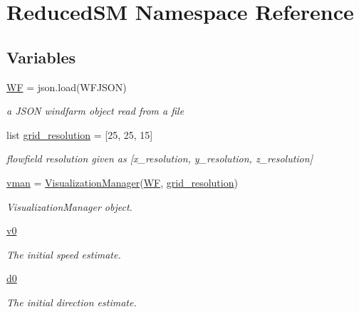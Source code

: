 \hypertarget{namespace_reduced_s_m}{}\section{Reduced\+SM Namespace Reference}
\label{namespace_reduced_s_m}
\subsection*{Variables}
\begin{DoxyCompactItemize}
\item 
\mbox{\hyperlink{namespace_reduced_s_m_ad2cb878a0bc5ba18176fff5ab9b02dc3}{WF}} = json.\+load(W\+F\+J\+S\+ON)
\begin{DoxyCompactList}\small\item\em a J\+S\+ON windfarm object read from a file \end{DoxyCompactList}\item 
list \mbox{\hyperlink{namespace_reduced_s_m_ac73e3bc6b17648d508dd822d76929524}{grid\+\_\+resolution}} = \mbox{[}25, 25, 15\mbox{]}
\begin{DoxyCompactList}\small\item\em flowfield resolution given as \mbox{[}x\+\_\+resolution, y\+\_\+resolution, z\+\_\+resolution\mbox{]} \end{DoxyCompactList}\item 
\mbox{\hyperlink{namespace_reduced_s_m_aea7c8ee42c44fbc9f8c3702567edc840}{vman}} = \mbox{\hyperlink{classvisualization__manager___d_j_1_1_visualization_manager}{Visualization\+Manager}}(\mbox{\hyperlink{namespace_reduced_s_m_ad2cb878a0bc5ba18176fff5ab9b02dc3}{WF}}, \mbox{\hyperlink{namespace_reduced_s_m_ac73e3bc6b17648d508dd822d76929524}{grid\+\_\+resolution}})
\begin{DoxyCompactList}\small\item\em Visualization\+Manager object. \end{DoxyCompactList}\item 
\mbox{\hyperlink{namespace_reduced_s_m_a67506428d79afaf78d10af90e7e90d3b}{v0}}
\begin{DoxyCompactList}\small\item\em The initial speed estimate. \end{DoxyCompactList}\item 
\mbox{\hyperlink{namespace_reduced_s_m_af7214d9d46df1ff209b258941ec86497}{d0}}
\begin{DoxyCompactList}\small\item\em The initial direction estimate. \end{DoxyCompactList}\item 

\end{DoxyCompactItemize}
